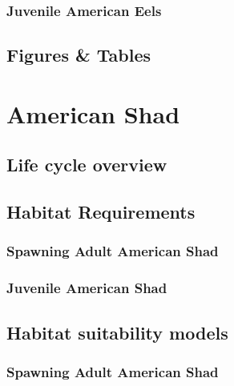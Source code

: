 \documentclass[
]{book}
\begin{document}
\hypertarget{juvenile-american-eels-1}{%
\subsection{Juvenile American Eels}\label{juvenile-american-eels-1}}

\hypertarget{figures-tables-1}{%
\section{Figures \& Tables}\label{figures-tables-1}}

\hypertarget{american-shad}{%
\chapter{American Shad}\label{american-shad}}

\hypertarget{life-cycle-overview-2}{%
\section{Life cycle overview}\label{life-cycle-overview-2}}

\hypertarget{habitat-requirements-2}{%
\section{Habitat Requirements}\label{habitat-requirements-2}}

\hypertarget{spawning-adult-american-shad}{%
\subsection{Spawning Adult American Shad}\label{spawning-adult-american-shad}}

\hypertarget{juvenile-american-shad}{%
\subsection{Juvenile American Shad}\label{juvenile-american-shad}}

\hypertarget{habitat-suitability-models-2}{%
\section{Habitat suitability models}\label{habitat-suitability-models-2}}

\hypertarget{spawning-adult-american-shad-1}{%
\subsection{Spawning Adult American Shad}\label{spawning-adult-american-shad-1}}
\end{document}
